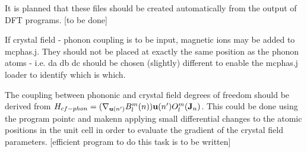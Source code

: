 It is planned that these files should be created automatically from the 
output of DFT programs. [to be done]

If crystal field - phonon coupling is to be input, magnetic ions may be added to {\prg mcphas.j}.
They should not be placed at exactly the same position as the phonon atoms - i.e. da db dc should be chosen
(slightly) different to enable the mcphas.j loader to identify which  is which.

The coupling between phononic and crystal field degrees of freedom should be derived from
$H_{cf-phon}=(\mathbf \nabla_{\mathbf u(n')} B_l^m(n))   \mathbf u(n')  O_l^m(\mathbf J_n)$. This could be done
using the program {\prg pointc} and {\prg makenn} applying small differential changes to
the atomic positions in the unit cell in order to evaluate the gradient of the crystal field
parameters. [efficient program to do this task is to be written]
